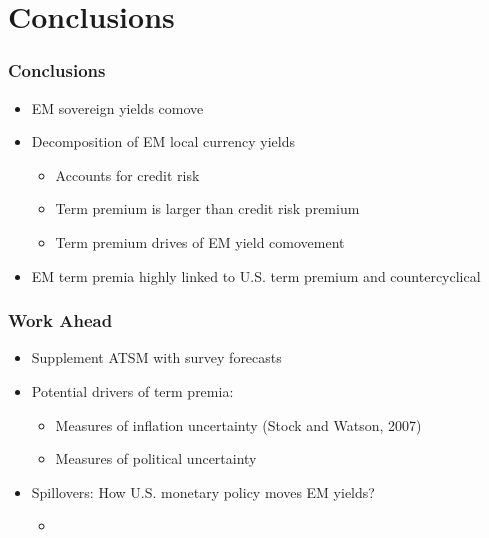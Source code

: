 \documentclass[12pt, aspectratio=169, xcolor=dvipsnames]{beamer}  %
\begin{document}
\section{Conclusions}

\begin{frame}
	\frametitle{Conclusions}
	\begin{itemize}
		\item EM sovereign yields comove
		\item Decomposition of EM local currency yields
		\begin{itemize}
			\item Accounts for credit risk
			\item Term premium is larger than credit risk premium
			\item Term premium drives of EM yield comovement
		\end{itemize}
		\item EM term premia highly linked to U.S. term premium and countercyclical
	\end{itemize}
\end{frame}

\begin{frame}
	\frametitle{Work Ahead}
	\begin{itemize}
		\item Supplement ATSM with survey forecasts
		\item Potential drivers of term premia:
		\begin{itemize}
			\item Measures of inflation uncertainty (Stock and Watson, 2007)
			\item Measures of political uncertainty \citep{BakerBloomDavis:2016}
		\end{itemize}
		\item Spillovers: How U.S. monetary policy moves EM yields?
		\begin{itemize}
			\item \cite{CurcuruKaminLiRodriguez:2018,ACDM:2019}
		\end{itemize}
	\end{itemize}
\end{frame}
\end{document}
